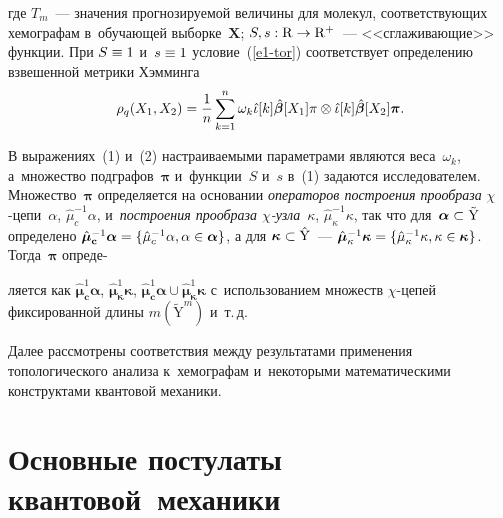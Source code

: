 \begin{multicols}{2}
     \vspace*{-2pt}
     
     \noindent
где $T_m$~--- значения прогнозируемой величины для молекул, 
соответствующих хемографам в~обуча\-ющей выборке~$\mathbf{X}$; $S, s: 
\mathrm{R}\hm\to \mathrm{R}^+$~--- <<сгла\-жи\-ва\-ющие>> функции. При 
$S\hm\equiv 1$ и~$s\hm\equiv 1$ условие~(\ref{e1-tor}) соответствует определению 
взвешенной метрики Хэм\-минга
\begin{equation}
\rho_q(X_1,X_2) =\displaystyle\frac{\displaystyle 1\mathstrut}{\displaystyle n\mathstrut}\sum\limits^n_{k=1}\omega_k \hat{\iota} [k] 
\hat{\bm{\beta}}[X_1] {\pi} \otimes \hat{\iota}[k]\hat{\bm{\beta}} 
[X_2]\bm{\pi}.\!
\label{e2-tor}
\end{equation}

\vspace*{-2pt}
    
В выражениях~(1) и~(2) настраиваемыми па\-ра\-мет\-ра\-ми являются 
веса~$\omega_k$, а~множество подграфов~$\bm{\pi}$ и~функции~$S$ и~$s$ в~(1) 
задаются исследователем. Множество~$\bm{\pi}$ определяется на \mbox{основании} 
\textit{операторов построения прообраза} $\chi$-це\-пи~$\alpha$, 
$\hat{\mu}_c^{-1}\alpha$, и~\textit{по\-стро\-ения прообраза $\chi$-уз\-ла}~$\kappa$, 
$\hat{\mu}_\kappa^{-1}\kappa$, так что
для~$\bm{\alpha}\hm\subset \tilde{\mathrm{Y}}$ определено 
$\hat{\bm{\mu}}_{\mathbf{c}}^{-1}\bm{\alpha} \hm= \{\hat{\mu}_c^{-1}\alpha, 
\alpha\hm\in \bm{\alpha}\}$, а для $\bm{\kappa}\hm\subset \hat{\mathrm{Y}}$~--- 
$\hat{\bm{\mu}}^{-1}_{\mathbf{\kappa}}\bm{\kappa}\hm= \{\hat{\mu}_\kappa^{-1}\kappa, 
\kappa\hm\in \bm{\kappa}\}$. Тогда~$\bm{\pi}$ опреде-\linebreak\vspace*{-12pt}

\pagebreak

\noindent
 ляется как 
$\hat{\bm{\mu}}_{\mathbf{c}}^1\bm{\alpha}$, 
$\hat{\bm{\mu}}_{\bm{\kappa}}^1\bm{\kappa}$, 
$\hat{\bm{\mu}}^1_{\mathbf{c}}\bm{\alpha}\cup 
\hat{\bm{\mu}}_{\bm{\kappa}}^1\bm{\kappa}$ с~использованием множеств 
$\chi$-це\-пей фиксированной длины $m (\tilde{\mathrm{Y}}^m)$ и~т.\,д. 

Далее 
рассмотрены соответствия между результатами применения топологического 
анализа к~хемографам и~некоторыми математическими конструктами квантовой 
механики.

\section{Основные постулаты квантовой~механики}


\end{multicols}
